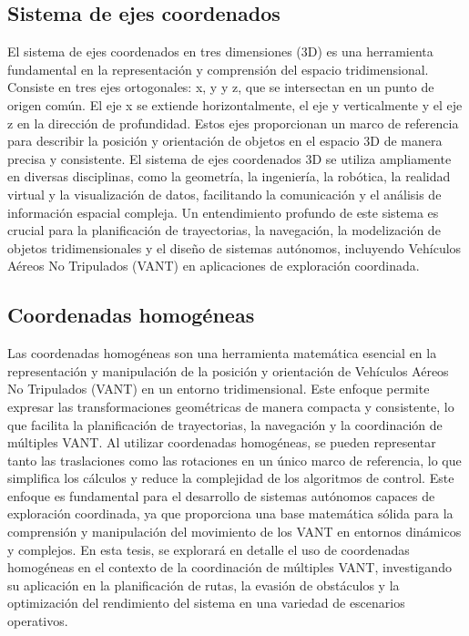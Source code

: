 \subsection*{Sistema de ejes coordenados}

El sistema de ejes coordenados en tres dimensiones (3D) es una herramienta fundamental en la representación y comprensión del espacio tridimensional. Consiste en tres ejes ortogonales: x, y y z, que se intersectan en un punto de origen común. El eje x se extiende horizontalmente, el eje y verticalmente y el eje z en la dirección de profundidad. Estos ejes proporcionan un marco de referencia para describir la posición y orientación de objetos en el espacio 3D de manera precisa y consistente. El sistema de ejes coordenados 3D se utiliza ampliamente en diversas disciplinas, como la geometría, la ingeniería, la robótica, la realidad virtual y la visualización de datos, facilitando la comunicación y el análisis de información espacial compleja. Un entendimiento profundo de este sistema es crucial para la planificación de trayectorias, la navegación, la modelización de objetos tridimensionales y el diseño de sistemas autónomos, incluyendo Vehículos Aéreos No Tripulados (VANT) en aplicaciones de exploración coordinada.

\subsection*{Coordenadas homogéneas}

Las coordenadas homogéneas son una herramienta matemática esencial en la representación y manipulación de la posición y orientación de Vehículos Aéreos No Tripulados (VANT) en un entorno tridimensional. Este enfoque permite expresar las transformaciones geométricas de manera compacta y consistente, lo que facilita la planificación de trayectorias, la navegación y la coordinación de múltiples VANT. Al utilizar coordenadas homogéneas, se pueden representar tanto las traslaciones como las rotaciones en un único marco de referencia, lo que simplifica los cálculos y reduce la complejidad de los algoritmos de control. Este enfoque es fundamental para el desarrollo de sistemas autónomos capaces de exploración coordinada, ya que proporciona una base matemática sólida para la comprensión y manipulación del movimiento de los VANT en entornos dinámicos y complejos. En esta tesis, se explorará en detalle el uso de coordenadas homogéneas en el contexto de la coordinación de múltiples VANT, investigando su aplicación en la planificación de rutas, la evasión de obstáculos y la optimización del rendimiento del sistema en una variedad de escenarios operativos.

